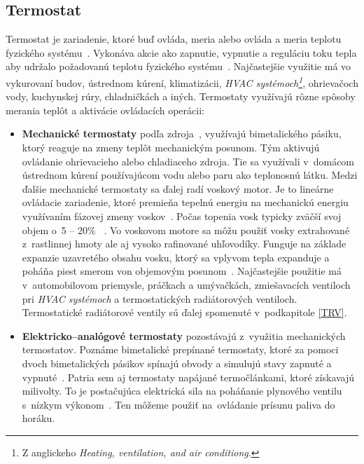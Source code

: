 \subsection{Termostat}\label{termostat}
Termostat je zariadenie, ktoré buď ovláda, meria alebo ovláda a meria teplotu fyzického systému~\cite{thermostat_definition_meaning}. 
Vykonáva akcie ako zapnutie, vypnutie a reguláciu toku tepla aby udržalo požadovanú teplotu fyzického systému~\cite{thermostat_definition_meaning}. 
Najčastejšie využitie má vo vykurovaní budov, ústrednom kúrení, klimatizácii, \emph{HVAC systémoch\footnote{Z anglickeho \emph{Heating, ventilation, and air conditiong}.}}, ohrievačoch vody, kuchynskej rúry, chladničkách a iných.
Termostaty využívajú rôzne spôsoby merania teplôt a aktivácie ovládacích operácii:
\begin{itemize}
    \item \textbf{Mechanické termostaty} podľa zdroja~\cite{w_2021}, využívajú bimetalického pásiku, ktorý reaguje na zmeny teplôt mechanickým posunom. 
    Tým aktivujú ovládanie ohrievacieho alebo chladiaceho zdroja. 
    Tie sa využívali v~domácom ústrednom kúrení používajúcom vodu alebo paru ako teplonosnú látku. 
    Medzi ďalšie mechanické termostaty sa ďalej radí voskový motor. 
    Je to lineárne ovládacie zariadenie, ktoré premieňa tepelnú energiu na mechanickú energiu využívaním fázovej zmeny voskov~\cite{ward1976anatomy}. 
    Počas topenia vosk typicky zväčší svoj objem o~5 – 20\% ~\cite{mozes1983paraffin}. 
    Vo voskovom motore sa môžu použiť vosky extrahované z~rastlinnej hmoty ale aj vysoko rafinované uhľovodíky. 
    Funguje na základe expanzie uzavretého obsahu vosku, ktorý sa vplyvom tepla expanduje a poháňa piest smerom von objemovým posunom~\cite{cdn_2020}. 
    Najčastejšie použitie má v~automobilovom priemysle, práčkach a umývačkách, zmiešavacích ventiloch pri \emph{HVAC systémoch} a termostatických radiátorových ventiloch. 
    Termostatické radiátorové ventily sú ďalej spomenuté v~podkapitole \ref{TRV}.
    \item \textbf{Elektricko–analógové termostaty} pozostávajú z~využitia mechanických termostatov. 
    Poznáme bimetalické prepínané termostaty, ktoré za pomoci dvoch bimetalických pásikov spínajú obvody a simulujú stavy zapnuté a vypnuté~\cite{w_2021}. 
    Patria sem aj termostaty napájané termočlánkami, ktoré získavajú milivolty. 
    To je postačujúca elektrická sila na poháňanie plynového ventilu s~nízkym výkonom~\cite{formisano_2022}. 
    Ten môžeme použiť na~ovládanie prísunu paliva do horáku.
    

\end{itemize}
